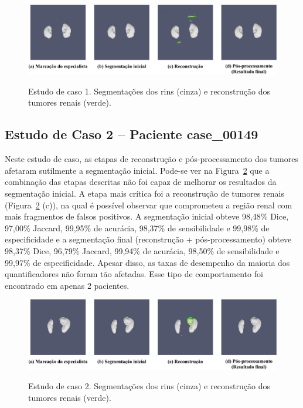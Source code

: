 \begin{figure}[!ht]
    \centering
    \caption{Estudo de caso 1. Segmentações dos rins (cinza) e reconstrução dos tumores renais (verde).}
    \includegraphics[width=1\textwidth]{figuras/estudos-casos-rins-1-18.pdf}
    \label{fig:estudo-rins-1}
\end{figure}

\subsection{Estudo de Caso 2 – Paciente case\_00149}
\label{sec:estudo-rins-caso-2}

Neste estudo de caso, as etapas de reconstrução e pós-processamento dos tumores afetaram sutilmente a segmentação inicial. Pode-se ver na Figura~\ref{fig:estudo-rins-2} que a combinação das etapas descritas não foi capaz de melhorar os resultados da segmentação inicial. A etapa mais crítica foi a reconstrução de tumores renais (Figura~\ref{fig:estudo-rins-2} (c)), na qual é possível observar que comprometeu a região renal com mais fragmentos de falsos positivos. A segmentação inicial obteve 98,48\% Dice, 97,00\% Jaccard, 99,95\% de acurácia, 98,37\% de sensibilidade e 99,98\% de especificidade e a segmentação final (reconstrução + pós-processamento) obteve 98,37\% Dice, 96,79\% Jaccard, 99,94\% de acurácia, 98,50\% de sensibilidade e 99,97\% de especificidade. Apesar disso, as taxas de desempenho da maioria dos quantificadores não foram tão afetadas. Esse tipo de comportamento foi encontrado em apenas 2 pacientes.

\begin{figure}[!ht]
    \centering
    \caption{Estudo de caso 2. Segmentações dos rins (cinza) e reconstrução dos tumores renais (verde).}
    \includegraphics[width=1\textwidth]{figuras/estudos-casos-rins-2-149.pdf}
    \label{fig:estudo-rins-2}
\end{figure}

